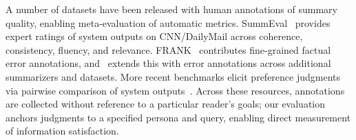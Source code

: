 A number of datasets have been released with human annotations of summary quality, enabling meta-evaluation of automatic metrics. SummEval~\cite{fabbri2021summeval} provides expert ratings of system outputs on CNN/DailyMail across coherence, consistency, fluency, and relevance. FRANK~\cite{pagnoni2021frank} contributes fine-grained factual error annotations, and~\textcite{tang-etal-2023-understanding} extends this with error annotations across additional summarizers and datasets. More recent benchmarks elicit preference judgments via pairwise comparison of system outputs~\cite{goyal2022news,liu2023benchmarking}. Across these resources, annotations are collected without reference to a particular reader's goals; our evaluation anchors judgments to a specified persona and query, enabling direct measurement of information satisfaction.
